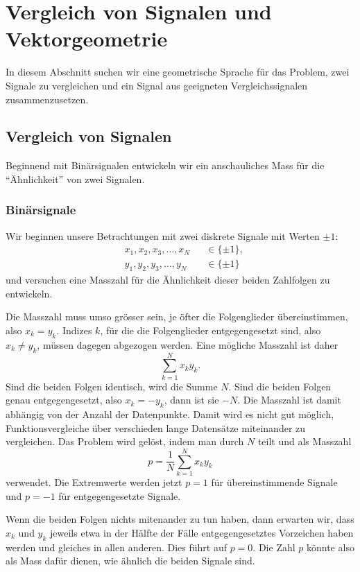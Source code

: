 %
%
%
\section{Vergleich von Signalen und Vektorgeometrie
\label{section:vergleich}}
In diesem Abschnitt suchen wir eine geometrische Sprache für das
Problem, zwei Signale zu vergleichen und ein Signal aus geeigneten
Vergleichssignalen zusammenzusetzen.

\subsection{Vergleich von Signalen}
Beginnend mit Binärsignalen entwickeln wir ein anschauliches Mass für die
``Ähnlichkeit'' von zwei Signalen.

\subsubsection{Binärsignale}
Wir beginnen unsere Betrachtungen mit zwei diskrete Signale mit Werten $\pm 1$:
\[
\begin{aligned}
&x_1,x_2,x_3,\dots,x_N &&\in \{\pm 1\},
\\
&y_1,y_2,y_3,\dots,y_N &&\in \{\pm 1\}
\end{aligned}
\]
und versuchen eine Masszahl für die Ähnlichkeit dieser beiden
Zahlfolgen zu entwickeln.

Die Masszahl muss umso grösser sein, je öfter die Folgenglieder
übereinstimmen, also $x_k=y_k$.
Indizes $k$, für die die Folgenglieder entgegengesetzt sind, also
$x_k\ne y_k$, müssen dagegen abgezogen werden.
Eine mögliche Masszahl ist daher 
\[
\sum_{k=1}^N x_ky_k.
\]
Sind die beiden Folgen identisch, wird die Summe $N$.
Sind die beiden Folgen genau entgegengesetzt, also $x_k=-y_k$, dann ist
sie $-N$.
Die Masszahl ist damit abhängig von der Anzahl der Datenpunkte.
Damit wird es nicht gut möglich, Funktionsvergleiche über verschieden
lange Datensätze miteinander zu vergleichen.
Das Problem wird gelöst, indem man durch $N$ teilt und als Masszahl
\[
p=\frac{1}{N} \sum_{k=1}^N x_ky_k
\]
verwendet.
Die Extremwerte werden jetzt $p=1$ für übereinstimmende Signale und
$p=-1$ für entgegengesetzte Signale.

Wenn die beiden Folgen nichts mitenander zu tun haben, dann erwarten
wir, dass $x_k$ und $y_k$ jeweils etwa in der Hälfte der Fälle
entgegengesetztes Vorzeichen haben werden und gleiches in allen
anderen.
Dies führt auf $p=0$.
Die Zahl $p$ könnte also als Mass dafür dienen, wie ähnlich die beiden Signale
sind.

